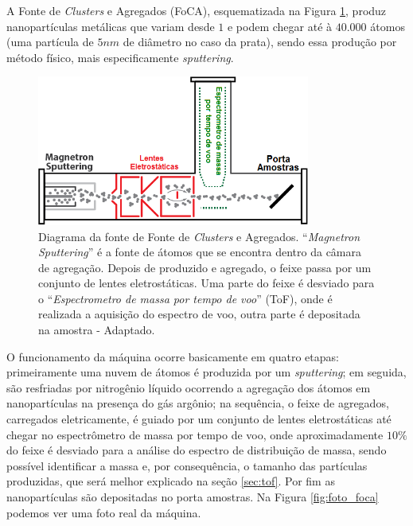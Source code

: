 

A Fonte de \textit{Clusters} e Agregados (FoCA), esquematizada na Figura \ref{fig:esquema_foca}, produz nanopartículas metálicas que variam desde $1$ e podem chegar até à $40.000$ átomos (uma partícula de $5nm$ de diâmetro no caso da prata), sendo essa produção por método físico, mais especificamente \textit{sputtering}.

\begin{figure}
  \centering
  \includegraphics[width=0.8\textwidth]{images/foca/esquematico_foca_pt}
  \caption{ Diagrama da fonte de Fonte de \textit{Clusters} e Agregados. ``\textit{Magnetron Sputtering}'' é a fonte de átomos que se encontra dentro da câmara de agregação. Depois de produzido e agregado, o feixe passa por um conjunto de lentes eletrostáticas. Uma parte do feixe é desviado para o ``\textit{Espectrometro de massa por tempo de voo}'' (ToF), onde é realizada a aquisição do espectro de voo, outra parte é depositada na amostra - Adaptado\cite{livro_vitor}.  }
  \label{fig:esquema_foca}
\end{figure}

O funcionamento da máquina ocorre basicamente em quatro etapas: primeiramente uma nuvem de átomos é produzida por um \textit{sputtering}; em seguida, são resfriadas por nitrogênio líquido ocorrendo a agregação dos átomos em nanopartículas na presença do gás argônio; na sequência, o feixe de agregados, carregados eletricamente, é guiado por um conjunto de lentes eletrostáticas até chegar no espectrômetro de massa por tempo de voo, onde aproximadamente $10\%$ do feixe é desviado para a análise do espectro de distribuição de massa, sendo possível identificar a massa e, por consequência, o tamanho das partículas produzidas, que será melhor explicado na seção \ref{sec:tof}. Por fim as nanopartículas são depositadas no porta amostras. Na Figura \ref{fig:foto_foca} podemos ver uma foto real da máquina. 



